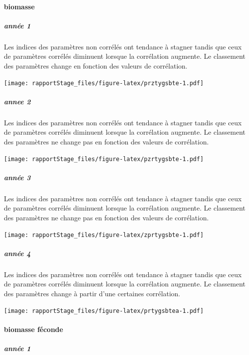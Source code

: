 \documentclass[
]{article}
\begin{document}
\hypertarget{biomasse-9}{%
\paragraph{biomasse}\label{biomasse-9}}

\hypertarget{annuxe9e-1}{%
\subparagraph{année 1}\label{annuxe9e-1}}

Les indices des paramètres non corrélés ont tendance à stagner tandis
que ceux de paramètres corrélés diminuent lorsque la corrélation
augmente. Le classement des paramètres change en fonction des valeurs de
corrélation.

\texttt{[image: rapportStage\_files/figure-latex/prztygsbte-1.pdf]}

\hypertarget{annee-2-3}{%
\subparagraph{annee 2}\label{annee-2-3}}

Les indices des paramètres non corrélés ont tendance à stagner tandis
que ceux de paramètres corrélés diminuent lorsque la corrélation
augmente. Le classement des paramètres ne change pas en fonction des
valeurs de corrélation.

\texttt{[image: rapportStage\_files/figure-latex/pzrtygsbte-1.pdf]}

\hypertarget{annuxe9e-3-2}{%
\subparagraph{année 3}\label{annuxe9e-3-2}}

Les indices des paramètres non corrélés ont tendance à stagner tandis
que ceux de paramètres corrélés diminuent lorsque la corrélation
augmente. Le classement des paramètres ne change pas en fonction des
valeurs de corrélation.

\texttt{[image: rapportStage\_files/figure-latex/zprtygsbte-1.pdf]}

\hypertarget{annuxe9e-4-2}{%
\subparagraph{année 4}\label{annuxe9e-4-2}}

Les indices des paramètres non corrélés ont tendance à stagner tandis
que ceux de paramètres corrélés diminuent lorsque la corrélation
augmente. Le classement des paramètres change à partir d'une certaines
corrélation.

\texttt{[image: rapportStage\_files/figure-latex/prtygsbtea-1.pdf]}

\hypertarget{biomasse-fuxe9conde-3}{%
\paragraph{biomasse féconde}\label{biomasse-fuxe9conde-3}}

\hypertarget{annuxe9e-1-1}{%
\subparagraph{année 1}\label{annuxe9e-1-1}}
\end{document}

